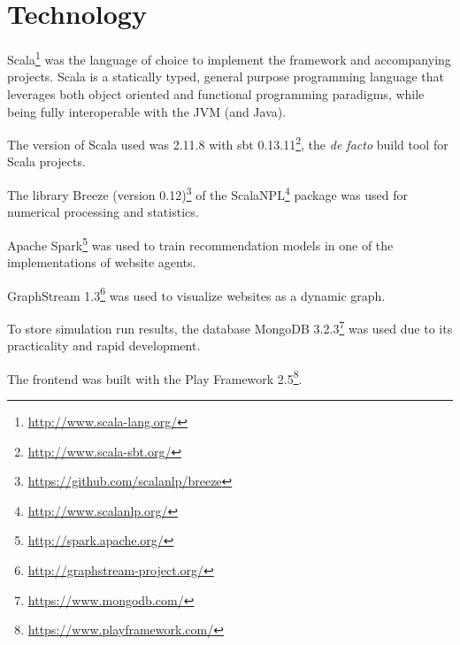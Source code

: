 \section{Technology}

Scala\footnote{\url{http://www.scala-lang.org/}} was the language of choice to 
implement the framework and accompanying projects. Scala is a statically typed, 
general purpose programming language that leverages both object oriented and 
functional programming paradigms, while being fully interoperable with the JVM 
(and Java).

The version of Scala used was 2.11.8 with sbt 
0.13.11\footnote{\url{http://www.scala-sbt.org/}}, the \textit{de facto} build 
tool for Scala projects.

The library Breeze (version 
0.12)\footnote{\url{https://github.com/scalanlp/breeze}} of the 
ScalaNPL\footnote{\url{http://www.scalanlp.org/}} package was used 
for numerical processing and statistics.

Apache Spark\footnote{\url{http://spark.apache.org/}} was used 
to train recommendation models in one of the implementations of website agents. 

GraphStream 1.3\footnote{\url{http://graphstream-project.org/}} was used to 
visualize websites as a dynamic graph.

To store simulation run results, the database MongoDB 
3.2.3\footnote{\url{https://www.mongodb.com/}} was used due to its practicality 
and rapid development.

The frontend was built with the Play Framework 
2.5\footnote{\url{https://www.playframework.com/}}.
